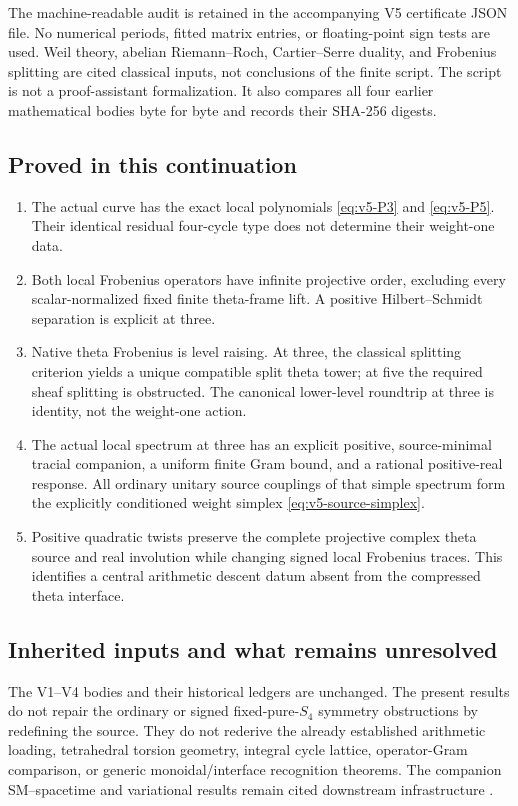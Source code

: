 \documentclass[11pt]{article}
\theoremstyle{definition}
\theoremstyle{remark}
\begin{document}
The machine-readable audit is retained in the accompanying V5 certificate
JSON file. No numerical periods, fitted matrix entries, or floating-point
sign tests are used. Weil theory, abelian Riemann--Roch, Cartier--Serre duality, and
Frobenius splitting are cited classical inputs, not conclusions of the
finite script. The script is not a proof-assistant formalization. It also
compares all four earlier mathematical bodies byte for byte and records
their SHA-256 digests.

\subsection{Proved in this continuation}
\begin{enumerate}[label=\textup{(P5.\arabic*)},leftmargin=3.6em]
\item The actual curve has the exact local polynomials
      \eqref{eq:v5-P3} and \eqref{eq:v5-P5}. Their identical residual
      four-cycle type does not determine their weight-one data.
\item Both local Frobenius operators have infinite projective order,
      excluding every scalar-normalized fixed finite theta-frame lift.
      A positive Hilbert--Schmidt separation is explicit at three.
\item Native theta Frobenius is level raising. At three, the classical
      splitting criterion yields a unique compatible split theta tower;
      at five the required sheaf splitting is obstructed. The canonical
      lower-level roundtrip at three is identity, not the weight-one action.
\item The actual local spectrum at three has an explicit positive,
      source-minimal tracial companion, a uniform finite Gram bound, and
      a rational positive-real response. All ordinary unitary source
      couplings of that simple spectrum form the explicitly conditioned
      weight simplex \eqref{eq:v5-source-simplex}.
\item Positive quadratic twists preserve the complete projective complex
      theta source and real involution while changing signed local
      Frobenius traces. This identifies a central arithmetic descent
      datum absent from the compressed theta interface.
\end{enumerate}

\subsection{Inherited inputs and what remains unresolved}
The V1--V4 bodies and their historical ledgers are unchanged. The present
results do not repair the ordinary or signed fixed-pure-$S_4$ symmetry
obstructions by redefining the source. They do not rederive the already
established arithmetic loading, tetrahedral torsion geometry, integral
cycle lattice, operator-Gram comparison, or generic monoidal/interface
recognition theorems. The companion SM--spacetime and variational results
remain cited downstream infrastructure \cite{Duality,Variational}.
\end{document}
